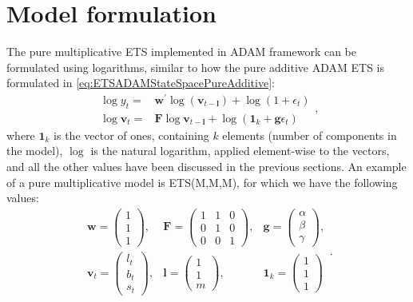 \documentclass[
]{book}
\theoremstyle{definition}
\theoremstyle{definition}
\theoremstyle{definition}
\theoremstyle{definition}
\theoremstyle{remark}
\begin{document}
\hypertarget{ADAMETSPureMultiplicative}{%
\section{Model formulation}\label{ADAMETSPureMultiplicative}}

The pure multiplicative ETS implemented in ADAM framework can be formulated using logarithms, similar to how the pure additive ADAM ETS is formulated in \eqref{eq:ETSADAMStateSpacePureAdditive}:
\begin{equation}
  \begin{aligned}
        \log y_t = & \mathbf{w}^\prime \log(\mathbf{v}_{t-\mathbf{l}}) + \log(1 + \epsilon_{t}) \\
        \log \mathbf{v}_{t} = & \mathbf{F} \log \mathbf{v}_{t-\mathbf{l}} + \log(\mathbf{1}_k + \mathbf{g} \epsilon_t)
  \end{aligned},
  \label{eq:ETSADAMStateSpacePureMultiplicative}
\end{equation}
where \(\mathbf{1}_k\) is the vector of ones, containing \(k\) elements (number of components in the model), \(\log\) is the natural logarithm, applied element-wise to the vectors, and all the other values have been discussed in the previous sections. An example of a pure multiplicative model is ETS(M,M,M), for which we have the following values:
\begin{equation}
  \begin{aligned}
    \mathbf{w} = \begin{pmatrix} 1 \\ 1 \\ 1 \end{pmatrix}, & \mathbf{F} = \begin{pmatrix} 1 & 1 & 0 \\ 0 & 1 & 0 \\ 0 & 0 & 1 \end{pmatrix}, & \mathbf{g} = \begin{pmatrix} \alpha \\ \beta \\ \gamma \end{pmatrix}, \\
    \mathbf{v}_{t} = \begin{pmatrix} l_t \\ b_t \\ s_t \end{pmatrix}, & \mathbf{l} = \begin{pmatrix} 1 \\ 1 \\ m \end{pmatrix}, & \mathbf{1}_k = \begin{pmatrix} 1 \\ 1 \\ 1 \end{pmatrix}
  \end{aligned}.
  \label{eq:ETSADAMMMMMatrices}
\end{equation}
\end{document}
